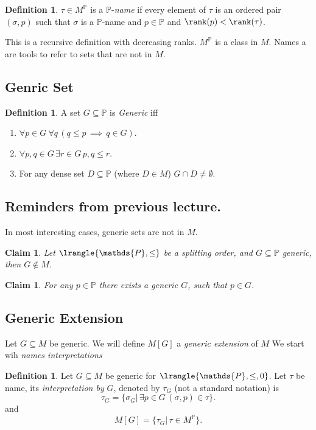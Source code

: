 \documentclass[11pt,pdftex,twoside,a4paper]{article}
\newcommand{\dsP}{\ensuremath{\mathds{P}}}
\newtheorem{claim}[thm]{Claim}
\theoremstyle{definition}
\newtheorem{ldef}[thm]{Definition}
\begin{document}
\begin{ldef}
\(\tau\in M^\dsP\) is a \dsP-\emph{name} if every element of \(\tau\)
is an ordered pair \((\sigma,p)\) such that \(\sigma\) is a \dsP-name
and \(p\in\dsP\) and \(\rank(p)<\rank(\tau)\).
\end{ldef}
This is a recursive definition with decreasing ranks.
\(M^\dsP\) is a class in $M$.
Names a are tools to refer to sets that are not in $M$.

\subsection{Genric Set}

\begin{ldef}
A set \(G\subseteq\dsP\) is \emph{Generic} iff
\begin{enumerate}
\item \(\forall p\in G\ \forall q\,(q\leq p \,\implies\, q\in G)\).
\item \(\forall p,q\in G\,\exists r\in G\, p,q\leq r\).
\item For any dense set
  \(D\subseteq \dsP\) (where \(D\in M\))  \(G\cap D\neq\emptyset\).
\end{enumerate}
\end{ldef}

\subsection{Reminders from previous lecture.}

In most interesting cases, generic sets are not in $M$.
\begin{claim}
Let \(\lrangle{\dsP,\leq}\) be a splitting order, and \(G\subseteq \dsP\)
generic, then \(G\notin M\).
\end{claim}

\begin{claim}
For any \(p\in\dsP\) there exists a generic $G$, such that \(p\in G\).
\end{claim}

\subsection{Generic Extension}

Let \(G\subseteq M\) be generic.
We will define \(M[G]\) a \emph{generic extension} of $M$
We start wih \emph{names interpretations}

\begin{ldef}
Let \(G\subseteq M\) be generic for \(\lrangle{\dsP,\leq,0}\).
Let \(\tau\) be name, its \emph{interpretation by} $G$,
denoted by \(\tau_G\) (not a standard notation) is
\begin{equation*}
\tau_G = \{\sigma_G|\, \exists p\in G\, (\sigma,p)\in \tau\}.
\end{equation*}
and
\begin{equation*}
M[G] = \{\tau_G|\,\tau \in M^\dsP\}.
\end{equation*}
\end{ldef}
\end{document}
